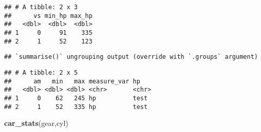 \documentclass[
]{article}
\newenvironment{Shaded}{\begin{snugshade}}{\end{snugshade}}
\newcommand{\CommentTok}[1]{\textcolor[rgb]{0.56,0.35,0.01}{\textit{#1}}}
\newcommand{\ControlFlowTok}[1]{\textcolor[rgb]{0.13,0.29,0.53}{\textbf{#1}}}
\newcommand{\DataTypeTok}[1]{\textcolor[rgb]{0.13,0.29,0.53}{#1}}
\newcommand{\KeywordTok}[1]{\textcolor[rgb]{0.13,0.29,0.53}{\textbf{#1}}}
\newcommand{\NormalTok}[1]{#1}
\newcommand{\OperatorTok}[1]{\textcolor[rgb]{0.81,0.36,0.00}{\textbf{#1}}}
\newcommand{\StringTok}[1]{\textcolor[rgb]{0.31,0.60,0.02}{#1}}
\begin{document}
\begin{verbatim}
## # A tibble: 2 x 3
##      vs min_hp max_hp
##   <dbl>  <dbl>  <dbl>
## 1     0     91    335
## 2     1     52    123
\end{verbatim}

\begin{Shaded}
\end{Shaded}

\begin{verbatim}
## `summarise()` ungrouping output (override with `.groups` argument)
\end{verbatim}

\begin{verbatim}
## # A tibble: 2 x 5
##      am   min   max measure_var hp   
##   <dbl> <dbl> <dbl> <chr>       <chr>
## 1     0    62   245 hp          test 
## 2     1    52   335 hp          test
\end{verbatim}

\begin{Shaded}
\begin{Highlighting}[]
\KeywordTok{car_stats}\NormalTok{(gear,cyl)}
\end{Highlighting}
\end{Shaded}
\end{document}
